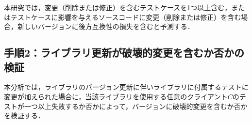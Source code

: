 \documentclass[submit]{ipsj}
\begin{document}


本研究では，変更（削除または修正）を含むテストケースを1つ以上含む，またはテストケースに影響を与えるソースコードに変更（削除または修正）を含む場合，新しいバージョンに後方互換性の損失を含むと予測する．

\subsection{手順2：ライブラリ更新が破壊的変更を含むか否かの検証}
\label{sec:step2}

本分析では，ライブラリのバージョン更新に伴いライブラリに付属するテストに変更が加えられた場合に，当該ライブラリを使用する任意のクライアント$C$のテストが一つ以上失敗するか否かによって，バージョンに破壊的変更を含むか否かを検証する．


\end{document}
